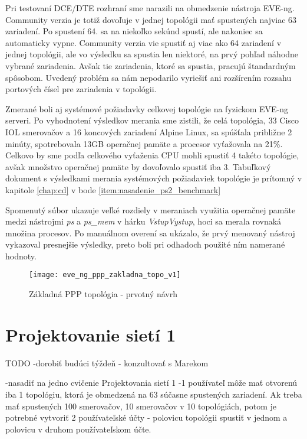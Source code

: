 Pri testovaní DCE/DTE rozhraní sme narazili na obmedzenie nástroja EVE-ng. Community verzia je totiž dovoľuje v jednej topológii mať spustených najviac 63 zariadení. Po spustení 64. sa na niekoľko sekúnd spustí, ale nakoniec sa automaticky vypne. Community verzia vie spustiť aj viac ako 64 zariadení v jednej topológii, ale vo výsledku sa spustia len niektoré, na prvý pohľad náhodne vybrané zariadenia. Avšak tie zariadenia, ktoré sa spustia, pracujú štandardným spôsobom. Uvedený problém sa nám nepodarilo vyriešiť ani rozšírením rozsahu portových čísel pre zariadenia v topológii.
  
Zmerané boli aj systémové požiadavky celkovej topológie na fyzickom EVE-ng serveri. Po vyhodnotení výsledkov merania sme zistili, že celá topológia, 33 Cisco IOL smerovačov a 16 koncových zariadení Alpine Linux, sa spúšťala približne 2 minúty, spotrebovala 13GB operačnej pamäte a procesor vyťažovala na 21\%. Celkovo by sme podľa celkového vyťaženia CPU mohli spustiť 4 takéto topológie, avšak množstvo operačnej pamäte by dovoľovalo spustiť iba 3. Tabuľkový dokument s výsledkami merania systémových požiadaviek topológie je prítomný v kapitole \ref{chap:cd} v bode \ref{item:nasadenie_ps2_benchmark}

Spomenutý súbor ukazuje veľké rozdiely v meraniach využitia operačnej pamäte medzi nástrojmi \emph{ps} a \emph{ps\_mem} v hárku \emph{VstupVystup}, hoci sa merala rovnaká množina procesov. Po manuálnom overení sa ukázalo, že prvý menovaný nástroj vykazoval presnejšie výsledky, preto boli pri odhadoch použité ním namerané hodnoty.

\begin{figure}
    \centering
    \texttt{[image: eve\_ng\_ppp\_zakladna\_topo\_v1]}
    \caption{Základná PPP topológia - prvotný návrh}
    \label{obr:eve_ng_ppp_zakladna_topo_v1}
\end{figure}





\section{Projektovanie sietí 1}

{\huge TODO -dorobiť budúci týždeň - konzultovať s Marekom}

-nasadiť na jedno cvičenie Projektovania sietí 1
-1 používateľ môže mať otvorenú iba 1 topológiu, ktorá je obmedzená na 63 súčasne spustených zariadení. Ak treba mať spustených 100 smerovačov, 10 smerovačov v 10 topológiách, potom je potrebné vytvoriť 2 používateľské účty - polovicu topológii spustiť v jednom a polovicu v druhom používateľskom účte.





